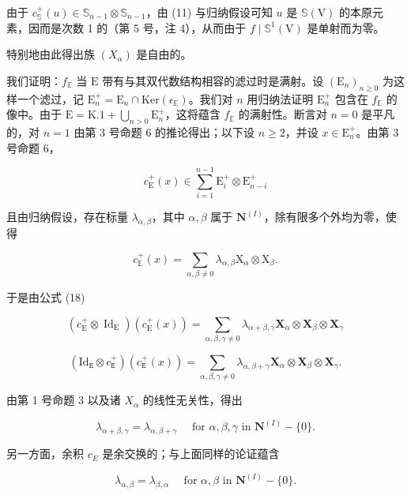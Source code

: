 由于 \(c_{\mathbb{S}}^{+}(u) \in \mathbb{S}_{n-1} \otimes \mathbb{S}_{n-1}\)，由 (11) 与归纳假设可知 \(u\) 是 \(\mathbb{S}(\mathrm{V})\) 的本原元素，因而是次数 1 的（第 5 号，注 4），从而由于 \(f \mid \mathbb{S}^1(\mathrm{V})\) 是单射而为零。

特别地由此得出族 \((X_{\alpha})\) 是自由的。

我们证明：\(f_{\mathbb{E}}\) 当 \(\mathrm{E}\) 带有与其双代数结构相容的滤过时是满射。设 \((\mathrm{E}_n)_{n\geqslant 0}\) 为这样一个滤过，记 \(\mathrm{E}_n^+ = \mathrm{E}_n\cap \mathrm{Ker}(\epsilon_{\mathbb{E}})\)。我们对 \(n\) 用归纳法证明 \(\mathrm{E}_n^+\) 包含在 \(f_{\mathbb{E}}\) 的像中。由于 \(\mathrm{E} = \mathrm{K}.1 + \bigcup_{n > 0}\mathrm{E}_n^+\)，这将蕴含 \(f_{\mathbb{E}}\) 的满射性。断言对 \(n = 0\) 是平凡的，对 \(n = 1\) 由第 3 号命题 6 的推论得出；以下设 \(n\geqslant 2\)，并设 \(x\in \mathrm{E}_n^+\)。由第 3 号命题 6，

\[
c _ {\mathrm{E}} ^ {+} (x) \in \sum_ {i = 1} ^ {n - 1} \mathrm{E} _ {i} ^ {+} \otimes \mathrm{E} _ {n - i} ^ {+}
\]

且由归纳假设，存在标量 \(\lambda_{\alpha, \beta}\)，其中 \(\alpha, \beta\) 属于 \(\mathbf{N}^{(I)}\)，除有限多个外均为零，使得

\[
c _ {\mathbb {E}} ^ {+} (x) = \sum_ {\alpha , \beta \neq 0} \lambda_ {\alpha , \beta} \mathrm{X} _ {\alpha} \otimes \mathrm{X} _ {\beta}.\tag{19}
\]

于是由公式 (18)

\[
(c _ {\mathrm{E}} ^ {+} \otimes \operatorname{Id} _ {\mathrm{E}}) (c _ {\mathrm{E}} ^ {+} (x)) = \sum_ {\alpha , \beta , \gamma \neq 0} \lambda_ {\alpha + \beta , \gamma} \mathbf {X} _ {\alpha} \otimes \mathbf {X} _ {\beta} \otimes \mathbf {X} _ {\gamma}
\]

\[
(\mathrm{Id} _ {\mathtt {E}} \otimes c _ {\mathtt {E}} ^ {+}) (c _ {\mathtt {E}} ^ {+} (x)) = \sum_ {\alpha , \beta , \gamma \neq 0} \lambda_ {\alpha , \beta + \gamma} \mathbf {X} _ {\alpha} \otimes \mathbf {X} _ {\beta} \otimes \mathbf {X} _ {\gamma}.
\]

由第 1 号命题 3 以及诸 \(X_{\alpha}\) 的线性无关性，得出

\[
\lambda_ {\alpha + \beta , \gamma} = \lambda_ {\alpha , \beta + \gamma} \quad \text { for } \alpha , \beta , \gamma \text { in } \mathbf {N} ^ {(I)} - \{0 \}.\tag{20}
\]

另一方面，余积 \(c_{E}\) 是余交换的；与上面同样的论证蕴含

\[
\lambda_ {\alpha , \beta} = \lambda_ {\beta , \alpha} \quad \text { for } \alpha , \beta \text { in } \mathbf {N} ^ {(I)} - \{0 \}.\tag{21}
\]

